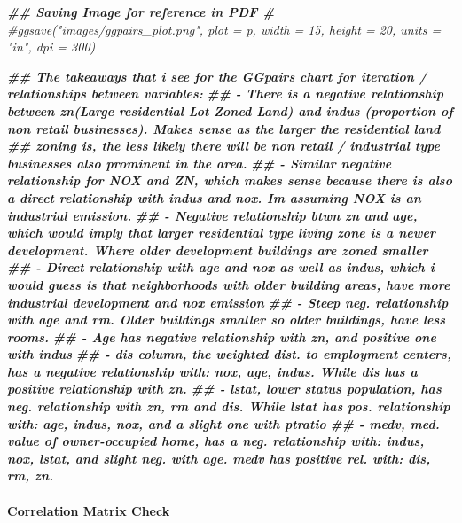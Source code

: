 \documentclass[
]{article}
\newenvironment{Shaded}{\begin{snugshade}}{\end{snugshade}}
\newcommand{\CommentTok}[1]{\textcolor[rgb]{0.56,0.35,0.01}{\textit{#1}}}
\newcommand{\DocumentationTok}[1]{\textcolor[rgb]{0.56,0.35,0.01}{\textbf{\textit{#1}}}}
\begin{document}
\begin{Shaded}
\begin{Highlighting}[]
\DocumentationTok{\#\# Saving Image for reference in PDF \#}
\CommentTok{\#ggsave("images/ggpairs\_plot.png", plot = p, width = 15, height = 20, units = "in", dpi = 300)}

\DocumentationTok{\#\# The takeaways that i see for the GGpairs chart for iteration / relationships between variables:}
\DocumentationTok{\#\#  {-} There is a negative relationship between zn(Large residential Lot Zoned Land) and indus (proportion of non retail businesses). Makes sense as the larger the residential land}
\DocumentationTok{\#\#    zoning is, the less likely there will be non retail / industrial type businesses also prominent in the area. }
\DocumentationTok{\#\#  {-} Similar negative relationship for NOX and ZN, which makes sense because there is also a direct relationship with indus and nox. Im assuming NOX is an industrial emission.}
\DocumentationTok{\#\#  {-} Negative relationship btwn zn and age, which would imply that larger residential type living zone is a newer development. Where older development buildings are zoned smaller}
\DocumentationTok{\#\#  {-} Direct relationship with age and nox as well as indus, which i would guess is that neighborhoods with older building areas, have more industrial development and nox emission}
\DocumentationTok{\#\#  {-} Steep neg. relationship with age and rm. Older buildings smaller so older buildings, have less rooms.}
\DocumentationTok{\#\#  {-} Age has negative relationship with zn, and positive one with indus}
\DocumentationTok{\#\#  {-} dis column, the weighted dist. to employment centers, has a negative relationship with: nox, age, indus. While dis has a positive relationship with zn.}
\DocumentationTok{\#\#  {-} lstat, lower status population, has neg. relationship with zn, rm and dis. While lstat has pos. relationship with: age, indus, nox, and a slight one with ptratio}
\DocumentationTok{\#\#  {-} medv, med. value of owner{-}occupied home, has a neg. relationship with: indus, nox, lstat, and slight neg. with age. medv has positive rel. with: dis, rm, zn.}
\end{Highlighting}
\end{Shaded}

\paragraph{Correlation Matrix Check}\label{correlation-matrix-check}
\end{document}
